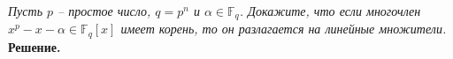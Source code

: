 \documentclass[a4paper, 10pt]{article}
\newcommand{\F}{\mathbb{F}}
\newcommand{\al}{\alpha}
\begin{document}
\begin{spacing}{1}
\begin{center}
\end{center}
		
\noindent \textit{Пусть $p$ -- простое число, $q = p^n$ и $\al\in\F_q$. Докажите, что если многочлен $x^p-x-\al \in \F_q[x]$ имеет корень, то он разлагается на линейные множители.
}\\
\noindent \textbf{Решение.} 
		
\end{spacing}
\end{document}
